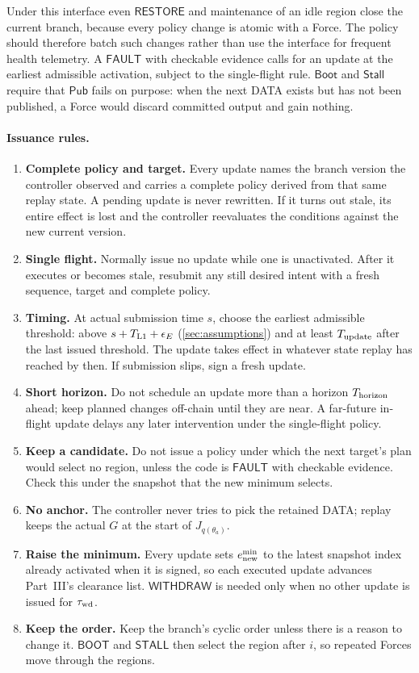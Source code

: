 \documentclass[11pt,a4paper]{article}
\newcommand{\tagg}[1]{\ensuremath{\mathsf{#1}}}
\begin{document}
Under this interface even \tagg{RESTORE} and maintenance of an idle
region close the current branch, because every policy change is atomic with
a Force. The policy should therefore batch such changes rather than use
the interface for frequent health telemetry. A \tagg{FAULT} with
checkable evidence calls for an update at the earliest admissible
activation, subject to the single-flight rule. $\tagg{Boot}$ and
$\tagg{Stall}$ require that $\tagg{Pub}$ fails on purpose: when the next
DATA exists but has not been published, a Force would discard committed
output and gain nothing.

\paragraph{Issuance rules.}
\begin{enumerate}[label=(R\arabic*)]
\item \textbf{Complete policy and target.} Every update names the branch
version the controller observed and carries a complete policy derived from
that same replay state. A pending update is never rewritten. If it turns
out stale, its entire effect is lost and the controller reevaluates the
conditions against the new current version.
\item \textbf{Single flight.} Normally issue no update while one is
unactivated. After it executes or becomes stale, resubmit any still
desired intent with a fresh sequence, target and complete policy.
\item \textbf{Timing.} At actual submission time $s$, choose the
earliest admissible threshold: above $s+T_{\rm L1}+\epsilon_E$
(\cref{sec:assumptions}) and at least $T_{\rm update}$ after the last
issued threshold. The update takes effect in whatever state replay has
reached by then. If submission slips, sign a fresh update.
\item \textbf{Short horizon.} Do not schedule an update more than a
horizon $T_{\rm horizon}$ ahead; keep planned changes off-chain until they are near.
A far-future in-flight update delays any later intervention under the
single-flight policy.
\item \textbf{Keep a candidate.} Do not issue a policy under which the
next target's plan would select no region, unless the code is
\tagg{FAULT} with checkable evidence. Check this under the snapshot that
the new minimum selects.
\item \textbf{No anchor.} The controller never tries to pick the
retained DATA; replay keeps the actual $G$ at the start of
$J_{q(\theta_a)}$.
\item \textbf{Raise the minimum.} Every update sets $e^{\min}_{\rm new}$
to the latest snapshot index already activated when it is signed, so
each executed update advances Part~III's clearance list. \tagg{WITHDRAW}
is needed only when no other update is issued for $\tau_{\rm wd}$.
\item \textbf{Keep the order.} Keep the branch's cyclic order unless there
is a reason to change it. \tagg{BOOT} and \tagg{STALL} then select the
region after $i$, so repeated Forces move through the regions.
\end{enumerate}
\end{document}
